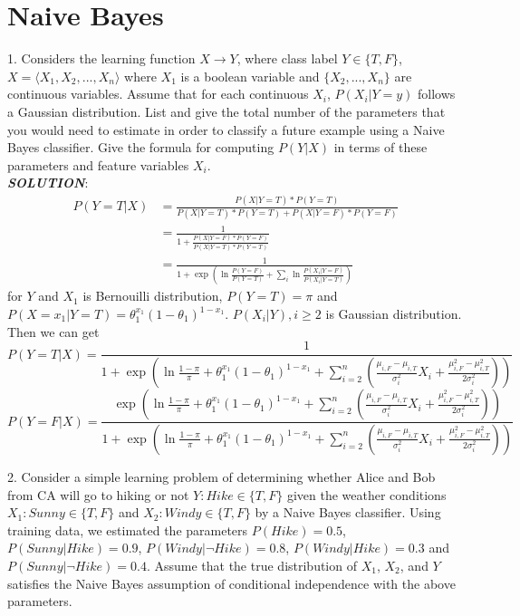 \documentclass{article}
\theoremstyle{definition}
\theoremstyle{definition}
\theoremstyle{remark}
\begin{document}
\section*{Naive Bayes}

1. Considers the learning function $X \rightarrow Y$, where class label $Y\in\{T,F\}$, $X=\langle X_1,X_2,...,X_n \rangle$ where $X_1$ is a boolean variable and $\{X_2,...,X_n\}$ are continuous variables. Assume that for each continuous $X_i$, $P(X_i|Y=y)$ follows a Gaussian distribution. List and give the total number of the parameters that you would need to estimate in order to classify a future example using a Naive Bayes classifier.
Give the formula for computing $P(Y|X)$ in terms of these
parameters and feature variables $X_i$.\\
\emph{\textbf{SOLUTION}}:\\
\begin{equation}\nonumber
\begin{aligned}
P(Y=T|X)&=\frac{P(X|Y=T)*P(Y=T)}{P(X|Y=T)*P(Y=T)+P(X|Y=F)*P(Y=F)}\\
        &=\frac{1}{1+\frac{P(X|Y=F)*P(Y=F)}{P(X|Y=T)*P(Y=T)}}\\
        &=\frac{1}{1+\exp\left(\ln\frac{P(Y=F)}{P(Y=T)}+\sum_i\ln\frac{P(X_i|Y=F)}{P(X_i|Y=T)}\right)}
\end{aligned}
\end{equation}
for $Y$ and $X_1$ is Bernouilli distribution, $P(Y=T)=\pi$ and $P(X=x_1|Y=T)=\theta_1^{x_1}(1-\theta_1)^{1-x_1}$. $P(X_i|Y),i\geq2$ is Gaussian distribution. Then we can get\\
\[
P(Y=T|X)=\frac{1}{1+\exp\left(\ln\frac{1-\pi}{\pi}+\theta_1^{x_1}(1-\theta_1)^{1-x_1}+\sum_{i=2}^{n}
\left(\frac{\mu_{i,F}-\mu_{i,T}}{\sigma_i^2}X_i+\frac{\mu_{i,F}^2-\mu_{i,T}^2}{2\sigma_i^2}\right)\right)}
\]
\[
P(Y=F|X)=\frac{\exp\left(\ln\frac{1-\pi}{\pi}+\theta_1^{x_1}(1-\theta_1)^{1-x_1}+\sum_{i=2}^{n}
\left(\frac{\mu_{i,F}-\mu_{i,T}}{\sigma_i^2}X_i+\frac{\mu_{i,F}^2-\mu_{i,T}^2}{2\sigma_i^2}\right)\right)}{1+\exp\left(\ln\frac{1-\pi}{\pi}+\theta_1^{x_1}(1-\theta_1)^{1-x_1}+\sum_{i=2}^{n}
\left(\frac{\mu_{i,F}-\mu_{i,T}}{\sigma_i^2}X_i+\frac{\mu_{i,F}^2-\mu_{i,T}^2}{2\sigma_i^2}\right)\right)}
\]


2. Consider a simple learning problem of determining whether Alice and Bob from CA will go to hiking or not
$Y:Hike\in\{T,F\}$ given the weather conditions $X_1:Sunny\in\{T,F\}$ and $X_2:Windy\in\{T,F\}$ by a
Naive Bayes classifier. Using training data, we estimated the parameters $P(Hike) = 0.5$, $P(Sunny|Hike) = 0.9$, $P(Windy|\neg Hike) = 0.8$, $P(Windy|Hike) = 0.3$ and $P(Sunny|\neg Hike) = 0.4$. Assume that the true distribution of $X_1$, $X_2$, and $Y$ satisfies the Naive Bayes
assumption of conditional independence with the above parameters.
\end{document}
